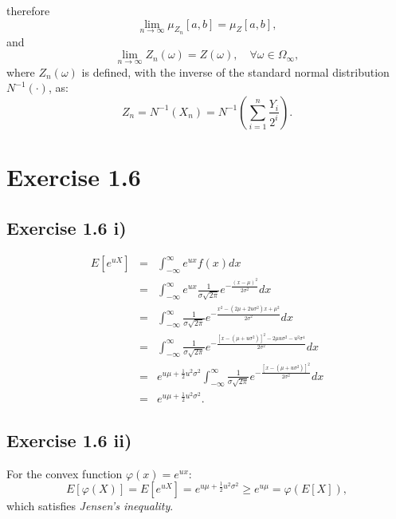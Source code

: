 \documentclass[final,3p,authoryear]{elsarticle}
\begin{document}
		therefore
		\begin{equation}
			\lim\limits_{n \to \infty} \mu_{Z_n}[a,b] = \mu_Z[a,b]
			,
		\end{equation}
		and
		\begin{equation}
			\lim\limits_{n \to \infty} Z_n(\omega) = Z(\omega),\quad \forall \omega \in \Omega_\infty
			,
		\end{equation}
		where $Z_n(\omega)$ is defined, with the inverse of the standard normal distribution $N^{-1}(\cdot)$, as:
		\begin{equation}
			Z_n=N^{-1}(X_n)=N^{-1}(\sum\limits_{i=1}^{n} \frac{Y_i}{2^i})
			.
		\end{equation}
		
\section{Exercise 1.6}
	\subsection{Exercise 1.6 i)}
		\begin{eqnarray}
			E[e^{uX}] &=& \int_{-\infty}^{\infty} e^{ux} f(x) dx
			\nonumber\\
			&=& \int_{-\infty}^{\infty} e^{ux} \frac{1}{\sigma \sqrt{2\pi}} e^{-\frac{(x-\mu)^2}{2\sigma^2}} dx
			\nonumber\\
			&=& \int_{-\infty}^{\infty} \frac{1}{\sigma \sqrt{2\pi}} e^{-\frac{x^2 - (2\mu + 2u \sigma^2)x + \mu^2}{2\sigma^2}} dx
			\nonumber\\
			&=& \int_{-\infty}^{\infty} \frac{1}{\sigma \sqrt{2\pi}} e^{-\frac{[x-(\mu + u\sigma^2)]^2 - 2\mu u \sigma^2 - u^2 \sigma^4}{2\sigma^2}} dx
			\nonumber\\
			&=& e^{u \mu + \frac{1}{2}u^2 \sigma^2} \int_{-\infty}^{\infty} \frac{1}{\sigma \sqrt{2\pi}} e^{-\frac{[x-(\mu + u\sigma^2)]^2}{2\sigma^2}} dx
			\nonumber\\
			&=& e^{u \mu + \frac{1}{2}u^2 \sigma^2}
			.
		\end{eqnarray}
	
	\subsection{Exercise 1.6 ii)}
		For the convex function $\varphi(x)=e^{ux}$:
		\begin{equation}
			E[\varphi(X)] = E[e^{uX}] = e^{u \mu + \frac{1}{2}u^2 \sigma^2} \geq e^{u\mu} = \varphi(E[X])
			,
		\end{equation}
		which satisfies {\it Jensen's inequality}.
		
\end{document}

